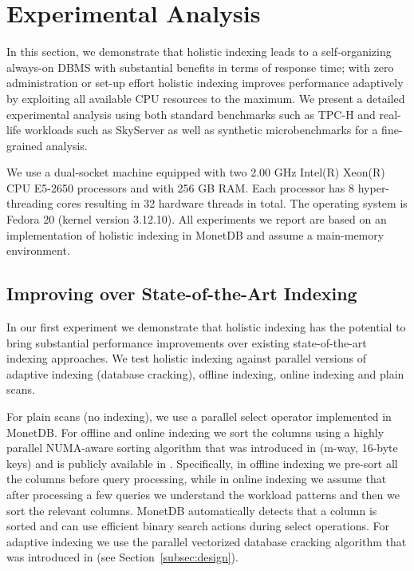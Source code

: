 \section{Experimental Analysis}
\label{sec:experiments}

In this section, we demonstrate that holistic indexing leads to a self-organizing always-on DBMS
with substantial benefits in terms of response time; with zero administration or set-up effort
holistic indexing improves performance adaptively by exploiting all available CPU resources to the maximum.
We present a detailed experimental analysis using both standard benchmarks such as TPC-H and
real-life workloads such as SkyServer as well as synthetic microbenchmarks for a fine-grained analysis.

We use a dual-socket machine equipped with two 2.00 GHz Intel(R) Xeon(R) CPU E5-2650 processors and with 256 GB RAM.
Each processor has 8 hyper-threading cores resulting in 32 hardware threads in total.
The operating system is Fedora 20 (kernel version 3.12.10).
All experiments we report are based on an implementation of holistic indexing in MonetDB 
and assume a main-memory environment.

\subsection{Improving over State-of-the-Art Indexing}
\label{subsec:motivation}

In our first  experiment we demonstrate that holistic indexing 
has the potential to bring substantial performance improvements over existing state-of-the-art indexing approaches.
We test holistic indexing against parallel versions of adaptive indexing (database cracking), 
offline indexing, online indexing and plain scans.

For plain scans (no indexing), we use a parallel select operator implemented in MonetDB.
For offline and online indexing we sort the columns using a highly parallel NUMA-aware sorting algorithm that was introduced in \cite{hash_join_rev} (m-way, 16-byte keys) and is publicly available in \cite{psort_site}.
Specifically, in offline indexing we pre-sort all the columns before query processing, while in online indexing we assume that after processing a few queries we understand the workload patterns and then we sort the relevant columns.
MonetDB automatically detects that a column is sorted and can use efficient binary search actions during select operations.
For adaptive indexing we use the parallel vectorized database cracking algorithm that was introduced in \cite{efficient_cracking} (see Section~\ref{subsec:design}).

